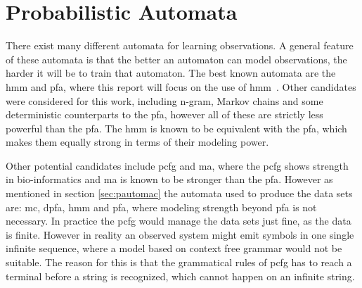 \section{Probabilistic Automata}
There exist many different automata for learning observations. A general feature of these automata is that the better an automaton can model observations, the harder it will be to train that automaton. The best known automata are the \gls{hmm} and \gls{pfa}, where this report will focus on the use of \gls{hmm}~\cite{pautomacTR}.
Other candidates were considered for this work, including n-gram, Markov chains and some deterministic counterparts to the \gls{pfa}, however all of these are strictly less powerful than the \gls{pfa}. The \gls{hmm} is known to be equivalent with the \gls{pfa}, which makes them equally strong in terms of their modeling power.

Other potential candidates include \gls{pcfg} and \gls{ma}, where the \gls{pcfg} shows strength in bio-informatics and \gls{ma} is known to be stronger than the \gls{pfa}. However as mentioned in section \ref{sec:pautomac} the automata used to produce the data sets are: \gls{mc}, \gls{dpfa}, \gls{hmm} and \gls{pfa}, where modeling strength beyond \gls{pfa} is not necessary. In practice the \gls{pcfg} would manage the data sets just fine, as the data is finite. However in reality an observed system might emit symbols in one single infinite sequence, where a model based on context free grammar would not be suitable. The reason for this is that the grammatical rules of \gls{pcfg} has to reach a terminal before a string is recognized, which cannot happen on an infinite string.